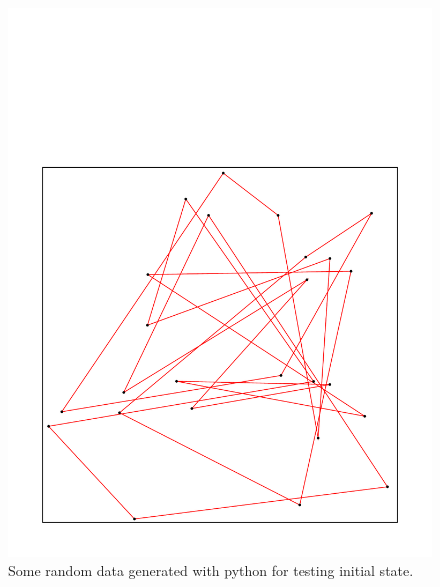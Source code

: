 \begin{figure}[htbp]
  \centering
  \includegraphics[width=1.0\textwidth]{./media/my_samples_raw.pdf}
  \caption{ \label{Figure_1}Some random data generated with python for testing initial state.}
\end{figure}

